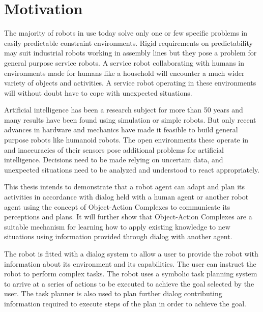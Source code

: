 \documentclass[english,ngerman]{KITreprt}
\begin{document}


\maketitle


\tableofcontents
\chapter{Motivation}
The majority of robots in use today solve only one or few specific problems in
easily predictable constraint environments. Rigid requirements on predictability
may suit industrial robots working in assembly lines but they pose a problem for
general purpose service robots. A service robot collaborating with humans in
environments made for humans like a household will encounter a much wider variety
of objects and activities. A service robot operating in these environments will
without doubt have to cope with unexpected situations.

Artificial intelligence has been a research subject for more than 50 years and
many results have been found using simulation or simple robots. But only recent
advances in hardware and mechanics have made it feasible to build general
purpose robots like humanoid robots. The open environments these operate in and
inaccuracies of their sensors pose additional problems for artificial
intelligence. Decisions need to be made relying on uncertain data, and unexpected
situations need to be analyzed and understood to react appropriately.

This thesis intends to demonstrate that a robot agent can adapt and plan its
activities in accordance with dialog held with a human agent or another robot
agent using the concept of Object-Action Complexes to communicate its
perceptions and plans. It will further show that Object-Action Complexes are a
suitable mechanism for learning how to apply existing knowledge to new
situations using information provided through dialog with another agent.

The robot is fitted with a dialog system to allow a user to provide the robot
with information about its environment and its capabilities. The user can
instruct the robot to perform complex tasks. The robot uses a symbolic task
planning system to arrive at a series of actions to be executed to achieve the
goal selected by the user. The task planner is also used to plan further dialog
contributing information required to execute steps of the plan in order to
achieve the goal.
\end{document}
